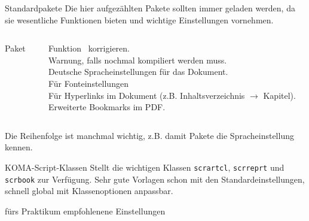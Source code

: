 \begin{frame}[fragile]{Standardpakete}
  Die hier aufgezählten Pakete sollten immer geladen werden, da sie wesentliche Funktionen bieten und wichtige Einstellungen vornehmen.
  \begin{columns}[T]
    \begin{column}{0.47\textwidth}
      \begin{block}{Paket}
        \begin{lstverbatim}
        \usepackage{fixltx2e}
        \usepackage[aux]{rerunfilecheck}

        \usepackage{polyglossia}
        \setmainlanguage{german}
        \usepackage{fontspec}

        \usepackage[unicode,pdfusetitle]{hyperref}
        \usepackage{bookmark}
        \end{lstverbatim}
      \end{block}
    \end{column}
    \begin{column}{0.47\textwidth}
      \begin{block}{Funktion}
        \LaTeXe\ korrigieren. \\
        Warnung, falls nochmal kompiliert werden muss. \\
        Deutsche Spracheinstellungen für das Dokument. \\
        Für Fonteinstellungen \\[2\baselineskip]
        Für Hyperlinks im Dokument (z.B. Inhaltsverzeichnis $\rightarrow$ Kapitel). \\
        Erweiterte Bookmarks im PDF.
      \end{block}
    \end{column}
  \end{columns}

  \vspace{5pt}
  Die Reihenfolge ist manchmal wichtig, z.B. damit Pakete die Spracheinstellung kennen.
\end{frame}

\begin{frame}[fragile]{
  KOMA-Script-Klassen
  \hfill{}
}
  Stellt die wichtigen Klassen \texttt{scrartcl}, \texttt{scrreprt} und \texttt{scrbook} zur Verfügung.
  Sehr gute Vorlagen schon mit den Standardeinstellungen, schnell global mit Klassenoptionen anpassbar.
  \begin{block}{fürs Praktikum empfohlenene Einstellungen}
  \end{block}
\end{frame}

